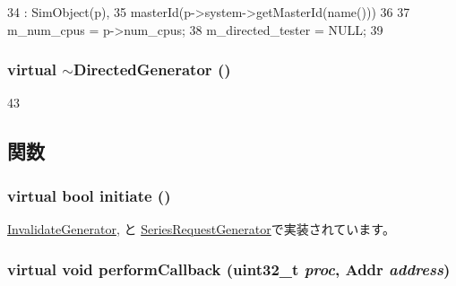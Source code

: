 \begin{DoxyCode}
34     : SimObject(p),
35       masterId(p->system->getMasterId(name()))
36 {
37     m_num_cpus = p->num_cpus;
38     m_directed_tester = NULL;
39 }
\end{DoxyCode}
\hypertarget{classDirectedGenerator_afb34ab7698dd5acf94263cc1664d8ac0}{
\subsubsection[{$\sim$DirectedGenerator}]{\setlength{\rightskip}{0pt plus 5cm}virtual $\sim${\bf DirectedGenerator} ()}}
\label{classDirectedGenerator_afb34ab7698dd5acf94263cc1664d8ac0}



\begin{DoxyCode}
43 {}
\end{DoxyCode}


\subsection{関数}
\hypertarget{classDirectedGenerator_a1c6f0032904b7bd7035a5cb7c88a8354}{
\subsubsection[{initiate}]{\setlength{\rightskip}{0pt plus 5cm}virtual bool initiate ()}}
\label{classDirectedGenerator_a1c6f0032904b7bd7035a5cb7c88a8354}


\hyperlink{classInvalidateGenerator_a4f5ee6a9e0c2962dfc0b4bb1978e6d28}{InvalidateGenerator}, と \hyperlink{classSeriesRequestGenerator_a4f5ee6a9e0c2962dfc0b4bb1978e6d28}{SeriesRequestGenerator}で実装されています。\hypertarget{classDirectedGenerator_a5aad2098d3cbda728f41beff10faea99}{
\subsubsection[{performCallback}]{\setlength{\rightskip}{0pt plus 5cm}virtual void performCallback ({\bf uint32\_\-t} {\em proc}, \/  {\bf Addr} {\em address})}}
\label{classDirectedGenerator_a5aad2098d3cbda728f41beff10faea99}


